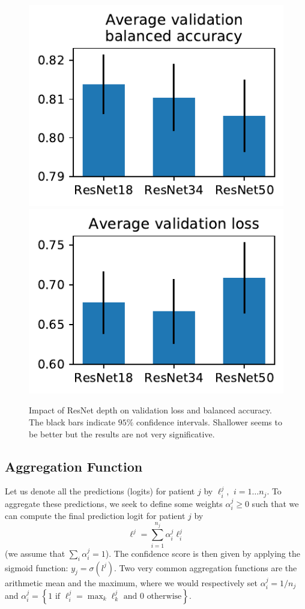 \documentclass[final]{cvpr}
\begin{document}
\begin{figure}[t]
	\begin{center}
		\includegraphics[width=0.47\linewidth]{fig/resnets_bal_acc.pdf}
		\includegraphics[width=0.47\linewidth]{fig/resnets_val_loss.pdf}
	\end{center}
	\caption{Impact of ResNet depth on validation loss and balanced accuracy. The black bars indicate $95\%$ confidence intervals. Shallower seems to be better but the results are not very significative.}
	\label{fig:resnet}
\end{figure}


	\subsection{Aggregation Function}

Let us denote all the predictions (logits) for patient $j$ by $\ell_i^j$, $\: i=1 \dots n_j$.
To aggregate these predictions, we seek to define some weights $\alpha_i^j \geq 0$ such that we can compute the final prediction logit for patient $j$ by
$$\ell^j = \sum_{i=1}^{n_j} \alpha_i^j \ell_i^j$$
(we assume that $\sum_i \alpha_i^j = 1$).
The confidence score is then given by applying the sigmoid function: $y_j = \sigma(l^j)$.
Two very common aggregation functions are the arithmetic mean and the maximum, where we would respectively set $\alpha_i^j = 1/n_j$ and $\alpha_i^j = \left\{ 1 \text{ if } \ell_i^j = \max_k \ell_k^j \text{ and } 0 \text{ otherwise}\right\}$.
\end{document}
